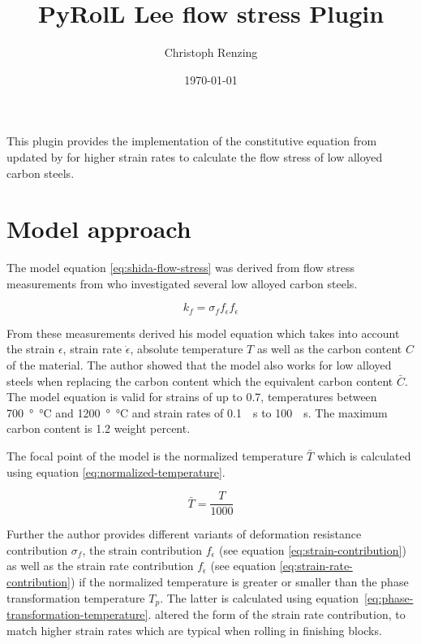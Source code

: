 \documentclass[11pt]{PyRollDocs}
\begin{document}
    \title{PyRolL Lee flow stress Plugin}
    \author{Christoph Renzing}
    \date{\today}

    \maketitle

    This plugin provides the implementation of the constitutive equation from \textcite{Shida1968, Shida1969} updated by \textcite{Lee2002} for higher strain rates to calculate the flow stress of low alloyed carbon steels.


    \section{Model approach}\label{sec:model-approach}

    The model equation \ref{eq:shida-flow-stress} was derived from flow stress measurements from \textcite{Suzuki1968} who investigated several low alloyed carbon steels.

    \begin{equation}
        k_f = \sigma_f f_{\epsilon} f_{\dot{\epsilon}}
        \label{eq:shida-flow-stress}
    \end{equation}

    From these measurements \textcite{Shida1968, Shida1969} derived his model equation which takes into account the strain $\epsilon$, strain rate $\dot{\epsilon}$, absolute temperature $T$ as well as the carbon content $C$ of the material.
    The author showed that the model also works for low alloyed steels when replacing the carbon content which the equivalent carbon content $\bar{C}$.
    The model equation is valid for strains of up to 0.7, temperatures between \qty{700}{\degree\celsius} and \qty{1200}{\degree\celsius} and strain rates of \qty{0.1}{\per\second} to \qty{100}{\per\second}.
    The maximum carbon content is 1.2 weight percent.

    The focal point of the model is the normalized temperature $\bar{T}$ which is calculated using equation \ref{eq:normalized-temperature}.

    \begin{equation}
        \bar{T} = \frac{T}{1000}
        \label{eq:normalized-temperature}
    \end{equation}

    Further the author provides different variants of deformation resistance contribution $\sigma_f$, the strain contribution $f_{\epsilon}$ (see equation \ref{eq:strain-contribution}) as well as the strain rate contribution $f_{\dot{\epsilon}}$ (see equation \ref{eq:strain-rate-contribution}) if the normalized temperature is greater or smaller than the phase transformation temperature $T_p$.
    The latter is calculated using equation~\ref{eq:phase-transformation-temperature}.
    \textcite{Lee2002} altered the form of the strain rate contribution, to match higher strain rates which are typical when rolling in finishing blocks.
\end{document}
